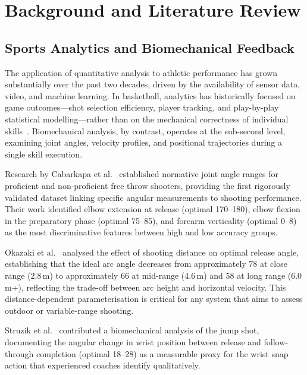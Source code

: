 \chapter{Background and Literature Review}
\label{chap:background}

\section{Sports Analytics and Biomechanical Feedback}
\label{sec:sports_analytics}

The application of quantitative analysis to athletic performance has grown substantially over the past two decades, driven by the availability of sensor data, video, and machine learning. In basketball, analytics has historically focused on game outcomes---shot selection efficiency, player tracking, and play-by-play statistical modelling---rather than on the mechanical correctness of individual skills~\cite{Goldman2013}. Biomechanical analysis, by contrast, operates at the sub-second level, examining joint angles, velocity profiles, and positional trajectories during a single skill execution.

Research by Cabarkapa et al.~\cite{Cabarkapa2021} established normative joint angle ranges for proficient and non-proficient free throw shooters, providing the first rigorously validated dataset linking specific angular measurements to shooting performance. Their work identified elbow extension at release (optimal 170--180\textdegree), elbow flexion in the preparatory phase (optimal 75--85\textdegree), and forearm verticality (optimal 0--8\textdegree) as the most discriminative features between high and low accuracy groups.

Okazaki et al.~\cite{Okazaki2012,Okazaki2015} analysed the effect of shooting distance on optimal release angle, establishing that the ideal arc angle decreases from approximately 78\textdegree{} at close range (2.8\,m) to approximately 66\textdegree{} at mid-range (4.6\,m) and 58\textdegree{} at long range (6.0\,m+), reflecting the trade-off between arc height and horizontal velocity. This distance-dependent parameterisation is critical for any system that aims to assess outdoor or variable-range shooting.

Struzik et al.~\cite{Struzik2014} contributed a biomechanical analysis of the jump shot, documenting the angular change in wrist position between release and follow-through completion (optimal 18--28\textdegree) as a measurable proxy for the wrist snap action that experienced coaches identify qualitatively.

